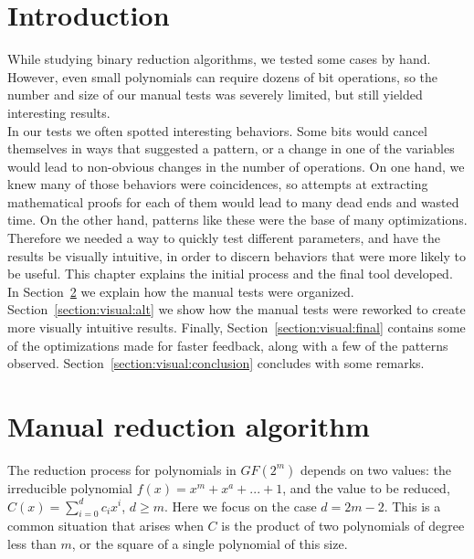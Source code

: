 \section{Introduction}

While studying binary reduction algorithms, we tested some cases by hand. However, even small polynomials can require dozens of bit operations, so the number and size of our manual tests was severely limited, but still yielded interesting results. \\

In our tests we often spotted interesting behaviors. Some bits would cancel themselves in ways that suggested a pattern, or a change in one of the variables would lead to non-obvious changes in the number of operations. On one hand, we knew many of those behaviors were coincidences, so attempts at extracting mathematical proofs for each of them would lead to many dead ends and wasted time. On the other hand, patterns like these were the base of many optimizations. \\

Therefore we needed a way to quickly test different parameters, and have the results be visually intuitive, in order to discern behaviors that were more likely to be useful. This chapter explains the initial process and the final tool developed. In Section~\ref{section:visual:manual} we explain how the manual tests were organized. Section~\ref{section:visual:alt} we show how the manual tests were reworked to create more visually intuitive results. Finally, Section~\ref{section:visual:final} contains some of the optimizations made for faster feedback, along with a few of the patterns observed. Section~\ref{section:visual:conclusion} concludes with some remarks. \\

\section{Manual reduction algorithm} \label{section:visual:manual}

The reduction process for polynomials in $GF(2^m)$ depends on two values: the irreducible polynomial $f(x) = x^m + x^a + ... + 1$, and the value to be reduced, $C(x) = \sum_{i=0}^{d} c_i x^i$, $d \geq m$. Here we focus on the case $d=2m-2$. This is a common situation that arises when $C$ is the product of two polynomials of degree less than $m$, or the square of a single polynomial of this size. \\

